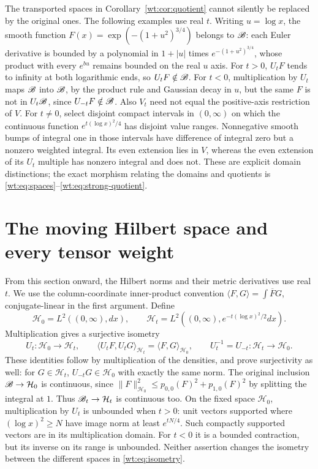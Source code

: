 The transported spaces in Corollary~\ref{wt:cor:quotient} cannot silently be
replaced by the original ones.  The following examples use real
$t$.  Writing $u=\log x$,
the smooth function
$F(x)=\exp(-(1+u^2)^{3/4})$ belongs to $\mathscr B$: each Euler
derivative is bounded by a polynomial in $1+|u|$ times
$e^{-(1+u^2)^{3/4}}$, whose product with every $e^{b u}$
remains bounded on the real $u$ axis.
For $t>0$, $U_tF$ tends to infinity at both logarithmic ends,
so $U_tF\notin\mathscr B$.  For $t<0$, multiplication by $U_t$ maps
$\mathscr B$ into $\mathscr B$, by the product rule and Gaussian decay in $u$,
but the same $F$ is not in $U_t\mathscr B$, since $U_{-t}F\notin\mathscr B$.
Also $V_t$ need not equal the positive-axis restriction of $V$.
For $t\ne0$, select disjoint compact intervals in $(0,\infty)$
on which the continuous function $e^{t(\log x)^2/4}$ has disjoint
value ranges.  Nonnegative smooth bumps of integral one in those
intervals have difference of integral zero but a nonzero weighted
integral.  Its even extension lies in $V$, whereas the even
extension of its $U_t$ multiple has nonzero integral and does not.
These are explicit domain distinctions; the exact morphism
relating the domains and quotients is
\eqref{wt:eq:spaces}--\eqref{wt:eq:strong-quotient}.

\section{The moving Hilbert space and every tensor weight}
\label{wt:sec:Hilbert}

From this section onward, the Hilbert norms and their metric
derivatives use real $t$.  We use the column-coordinate inner-product convention
$\langle F,G\rangle=\int\overline F G$, conjugate-linear in
the first argument.  Define
\begin{equation}\label{wt:eq:Hilbert}
 \mathcal H_0=L^2((0,\infty),dx),\qquad
 \mathcal H_t=L^2((0,\infty),e^{-t(\log x)^2/2}dx).
\end{equation}
Multiplication gives a surjective isometry
\begin{equation}\label{wt:eq:isometry}
 U_t:\mathcal H_0\longrightarrow \mathcal H_t,\qquad
 \langle U_tF,U_tG\rangle_{\mathcal H_t}=\langle F,G\rangle_{\mathcal H_0},
 \qquad U_t^{-1}=U_{-t}:\mathcal H_t\longrightarrow \mathcal H_0.
\end{equation}
These identities follow by multiplication of the densities,
and prove surjectivity as well: for $G\in \mathcal H_t$, $U_{-t}G\in \mathcal H_0$
with exactly the same norm.  The original inclusion $\mathscr B\to \mathcal H_0$
is continuous, since
$\|F\|_{\mathcal H_0}^2\leq p_{0,0}(F)^2+p_{1,0}(F)^2$ by splitting
the integral at $1$.  Thus $\mathscr B_t\to \mathcal H_t$ is continuous too.
On the fixed space $\mathcal H_0$, multiplication by $U_t$ is unbounded
when $t>0$: unit vectors supported where $(\log x)^2\geq N$
have image norm at least $e^{tN/4}$.  Such compactly supported
vectors are in its multiplication domain.  For $t<0$ it is a
bounded contraction, but its inverse on its range is unbounded.
Neither assertion changes the isometry between the different
spaces in \eqref{wt:eq:isometry}.

